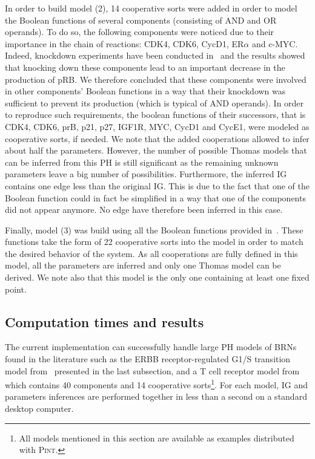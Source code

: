 In order to build model (2), 14 cooperative sorts were added in order to model the Boolean functions of several components
(consisting of AND and OR operands).
To do so, the following components were noticed due to their importance in the chain of reactions:
CDK4, CDK6, CycD1, ER$\alpha$ and c-MYC.
Indeed, knockdown experiments have been conducted in~\cite{Sahin09}
and the results showed that knocking down these components lead to an important decrease in the production of pRB.
We therefore concluded that these components were involved in other components' Boolean functions
in a way that their knockdown was sufficient to prevent its production (which is typical of AND operands).
In order to reproduce such requirements, the boolean functions of their successors,
that is CDK4, CDK6, prB, p21, p27, IGF1R, MYC, CycD1 and CycE1,
were modeled as cooperative sorts, if needed.
We note that the added cooperations allowed to infer about half the parameters.
However, the number of possible Thomas models that can be inferred from this PH is still significant
as the remaining unknown parameters leave a big number of possibilities.
Furthermore, the inferred IG contains one edge less than the original IG. This is due to the fact that
one of the Boolean function could in fact be simplified in a way that one of the components did not appear anymore.
No edge have therefore been inferred in this case.

Finally, model (3) was build using all the Boolean functions provided in~\cite{Sahin09}.
These functions take the form of 22 cooperative sorts into the model in order to match the desired behavior of the system.
As all cooperations are fully defined in this model, all the parameters are inferred and only one Thomas model can be derived.
We note also that this model is the only one containing at least one fixed point.



\subsection{Computation times and results}

The current implementation can successfully handle large PH models of BRNs found in the literature
such as the ERBB receptor-regulated G1/S transition model from~\cite{Sahin09} presented in the last subsection,
and a T cell receptor model from~\cite{Klamt06} which contains 40 components and 14 cooperative
sorts\footnote{All models mentioned in this section are available as examples distributed with \textsc{Pint}.}.
For each model, IG and parameters inferences are performed together in less than a second
on a standard desktop computer.

